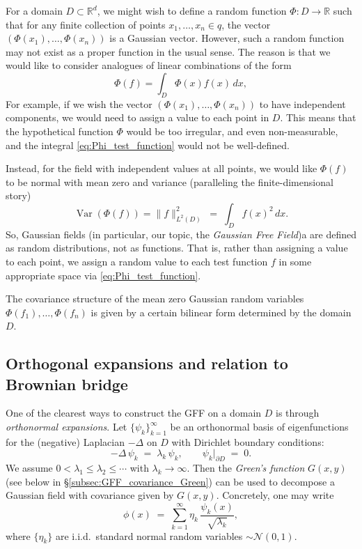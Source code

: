 \documentclass[letterpaper,11pt,oneside,reqno]{article}
\numberwithin{equation}{section}
\theoremstyle{definition}
\begin{document}
For a domain $D \subset \mathbb{R}^d$, we might wish to
define a random function $\Phi: D \rightarrow \mathbb{R}$
such that for any finite collection of points $x_1, \ldots,
x_n \in q$, the vector $(\Phi(x_1), \ldots, \Phi(x_n))$ is a
Gaussian vector. However, such a random function may not
exist as a proper function in the usual sense.
The reason is that we would like to consider analogues of linear combinations 
of the form
\begin{equation}
	\label{eq:Phi_test_function}
    \Phi(f) = \int_D \Phi(x) f(x) \, dx,
\end{equation}
For example, if we wish the vector $(\Phi(x_1), \ldots, \Phi(x_n))$ to have independent components, we would need to assign a value to each point in $D$. This means that the hypothetical function $\Phi$ would be too irregular, and even non-measurable, and the integral
\eqref{eq:Phi_test_function} would not be well-defined.

Instead, for the field with independent values at all points, we would like $\Phi(f)$ to be normal 
with mean zero and variance (paralleling the finite-dimensional story)
\begin{equation*}
	\operatorname{\mathrm{Var}}\left(  
	\Phi(f)\right) = \|f\|^2_{L^2(D)} \;=\; \int_D f(x)^2 \, dx.
\end{equation*}
So, Gaussian fields (in particular, our topic, the \emph{Gaussian Free Field})a
are defined as random distributions, not as functions.
That is, rather than assigning a value to each point, 
we assign a random value to each test function $f$ in some appropriate space
via \eqref{eq:Phi_test_function}.

The covariance structure of the mean zero Gaussian random variables
$\Phi(f_1), \ldots, \Phi(f_n)$ is given by a certain bilinear
form determined by the domain $D$.

\subsection{Orthogonal expansions and relation to Brownian bridge}
\label{subsec:orthonormal_series_GFF}

One of the clearest ways to construct the GFF on a domain $D$ is through \emph{orthonormal expansions}. Let $\{\psi_k\}_{k=1}^{\infty}$ be an orthonormal basis of eigenfunctions for the (negative) Laplacian $-\Delta$ on $D$ with Dirichlet boundary conditions:
\[
   -\Delta \,\psi_k \;=\; \lambda_k\, \psi_k,
   \qquad \psi_k\bigl|_{\partial D} \;=\; 0.
\]
We assume $0 < \lambda_1 \le \lambda_2 \le \cdots$ with $\lambda_k \to \infty$. Then the \emph{Green's function} $G(x,y)$ (see below in \S\ref{subsec:GFF_covariance_Green}) can be used to decompose a Gaussian field with covariance given by $G(x,y)$. Concretely, one may write
\[
  \phi(x) \;=\; \sum_{k=1}^{\infty} \eta_k \,\frac{\psi_k(x)}{\sqrt{\lambda_k}},
\]
where $\{\eta_k\}$ are i.i.d.\ standard normal random variables $\sim \mathcal{N}(0,1)$. 
\end{document}
